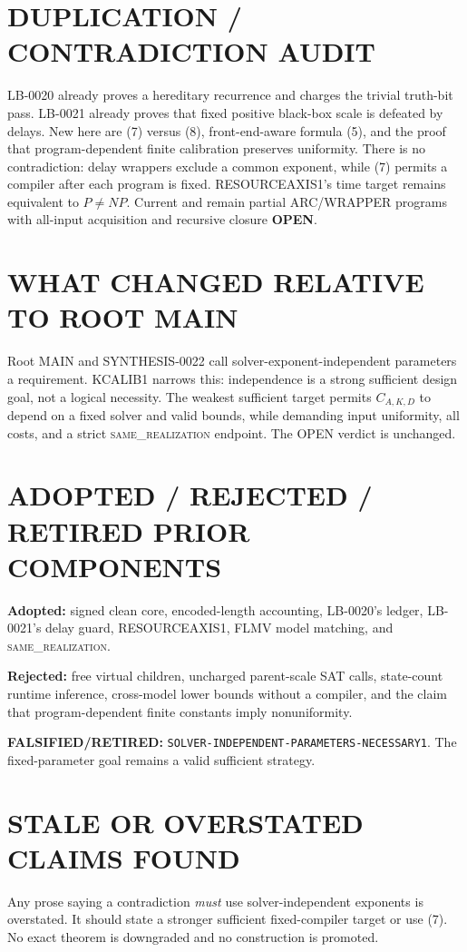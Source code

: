 \documentclass[11pt]{article}
\newcommand{\OPEN}{\textbf{OPEN}}
\newcommand{\same}{\textsc{same\_realization}}
\begin{document}
\section{DUPLICATION / CONTRADICTION AUDIT}
LB-0020 already proves a hereditary recurrence and charges the trivial
truth-bit pass. LB-0021 already proves that fixed positive black-box scale is
defeated by delays. New here are (7) versus (8), front-end-aware formula (5),
and the proof that program-dependent finite calibration preserves uniformity.
There is no contradiction: delay wrappers exclude a common exponent, while
(7) permits a compiler after each program is fixed. RESOURCEAXIS1's time
target remains equivalent to $P\ne NP$. Current  and
 remain partial ARC/WRAPPER programs with all-input acquisition
and recursive closure \OPEN.

\section{WHAT CHANGED RELATIVE TO ROOT MAIN}
Root MAIN and SYNTHESIS-0022 call solver-exponent-independent parameters a
requirement. KCALIB1 narrows this: independence is a strong sufficient design
goal, not a logical necessity. The weakest sufficient target permits
$C_{A,K,D}$ to depend on a fixed solver and valid bounds, while demanding
input uniformity, all costs, and a strict \same{} endpoint. The OPEN verdict is
unchanged.

\section{ADOPTED / REJECTED / RETIRED PRIOR COMPONENTS}
\textbf{Adopted:} signed clean core, encoded-length accounting, LB-0020's
ledger, LB-0021's delay guard, RESOURCEAXIS1, FLMV model matching, and \same{}.

\textbf{Rejected:} free virtual children, uncharged parent-scale SAT calls,
state-count runtime inference, cross-model lower bounds without a compiler,
and the claim that program-dependent finite constants imply nonuniformity.

\textbf{FALSIFIED/RETIRED:}
\texttt{SOLVER-INDEPENDENT-PARAMETERS-NECESSARY1}. The fixed-parameter goal
remains a valid sufficient strategy.

\section{STALE OR OVERSTATED CLAIMS FOUND}
Any prose saying a contradiction \emph{must} use solver-independent exponents
is overstated. It should state a stronger sufficient fixed-compiler target or
use (7). No exact theorem is downgraded and no construction is promoted.
\end{document}
